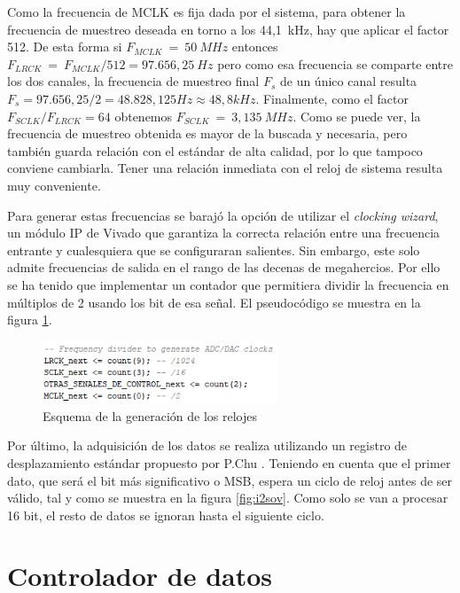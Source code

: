 Como la frecuencia de MCLK es fija dada por el sistema, para obtener la frecuencia de muestreo deseada en torno a los 44,1~kHz, hay que aplicar el factor 512. De esta forma si $F_{MCLK}~=~50~MHz$ entonces $F_{LRCK}~=~F_{MCLK}/512 = 97.656,25~Hz$ pero como esa frecuencia se comparte entre los dos canales, la frecuencia de muestreo final $F_{s}$ de un único canal resulta $F_{s} = 97.656,25/2 = 48.828,125 Hz \approx 48,8 kHz$. Finalmente, como el factor $F_{SCLK}/F_{LRCK}=64$ obtenemos $F_{SCLK}~=~3,135~MHz$. Como se puede ver, la frecuencia de muestreo obtenida es mayor de la buscada y necesaria, pero también guarda relación con el estándar de alta calidad, por lo que tampoco conviene cambiarla. Tener una relación inmediata con el reloj de sistema resulta muy conveniente.

Para generar estas frecuencias se barajó la opción de utilizar el \emph{clocking wizard}, un módulo IP de Vivado que garantiza la correcta relación entre una frecuencia entrante y cualesquiera que se configuraran salientes. Sin embargo, este solo admite frecuencias de salida en el rango de las decenas de megahercios. Por ello se ha tenido que implementar un contador que permitiera dividir la frecuencia en múltiplos de 2 usando los bit de esa señal. El pseudocódigo se muestra en la figura \ref{fig:controlsig}.

\begin{figure}[!h]
\begin{center}
\includegraphics[width=7cm]{img/controlsig.png}
\caption{\label{fig:controlsig}Esquema de la generación de los relojes}
\end{center}
\end{figure}

Por último, la adquisición de los datos se realiza utilizando un registro de desplazamiento estándar propuesto por P.Chu \cite{vhdlchu}. Teniendo en cuenta que el primer dato, que será el bit más significativo o MSB, espera un ciclo de reloj antes de ser válido, tal y como se muestra en la figura \ref{fig:i2sov}. Como solo se van a procesar 16 bit, el resto de datos se ignoran hasta el siguiente ciclo.

\section{Controlador de datos}

